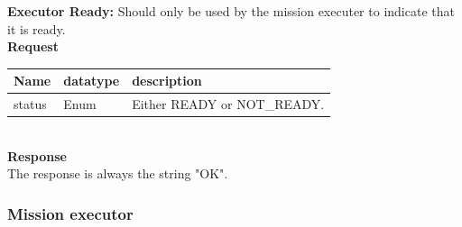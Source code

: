 \documentclass[main.tex]{subfiles}
\begin{document}
\textbf{Executor Ready:}
Should only be used by the mission executer to indicate that it is ready. \\
\textbf{Request}\\
\begin{tabular}{|l|l|l|}
    \hline
    Name & datatype & description \\
    \hline
    \hline
    status & Enum & Either READY or NOT\_READY. \\
    \hline
\end{tabular} \\
\textbf{Response}\\
The response is always the string "OK".



\subsubsection{Mission executor}
\label{sec:mission_executor}
\end{document}
